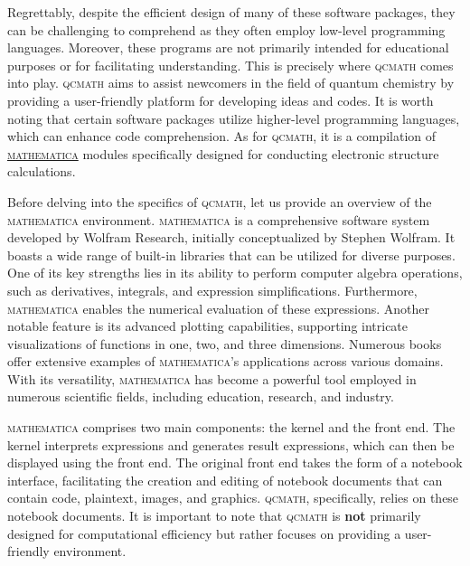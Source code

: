 \documentclass[aip,jcp,reprint,noshowkeys,superscriptaddress]{revtex4-1}
\newcommand{\qcmath}{\textsc{qcmath}\xspace}
\newcommand{\mathematica}{\textsc{mathematica}\xspace}
\begin{document}
Regrettably, despite the efficient design of many of these software packages, they can be challenging to comprehend as they often employ low-level programming languages. Moreover, these programs are not primarily intended for educational purposes or for facilitating understanding. This is precisely where \qcmath comes into play. \qcmath aims to assist newcomers in the field of quantum chemistry by providing a user-friendly platform for developing ideas and codes. It is worth noting that certain software packages utilize higher-level programming languages, which can enhance code comprehension. As for \qcmath, it is a compilation of \href{https://www.wolfram.com/mathematica/}{\mathematica} modules specifically designed for conducting electronic structure calculations.

Before delving into the specifics of \qcmath, let us provide an overview of the \mathematica environment. \mathematica is a comprehensive software system developed by Wolfram Research, initially conceptualized by Stephen Wolfram. It boasts a wide range of built-in libraries that can be utilized for diverse purposes. One of its key strengths lies in its ability to perform computer algebra operations, such as derivatives, integrals, and expression simplifications. Furthermore, \mathematica enables the numerical evaluation of these expressions. Another notable feature is its advanced plotting capabilities, supporting intricate visualizations of functions in one, two, and three dimensions. Numerous books offer extensive examples of \mathematica's applications across various domains. With its versatility, \mathematica has become a powerful tool employed in numerous scientific fields, including education, research, and industry.

\mathematica comprises two main components: the kernel and the front end. The kernel interprets expressions and generates result expressions, which can then be displayed using the front end. The original front end takes the form of a notebook interface, facilitating the creation and editing of notebook documents that can contain code, plaintext, images, and graphics. \qcmath, specifically, relies on these notebook documents. It is important to note that \qcmath is \textbf{not} primarily designed for computational efficiency but rather focuses on providing a user-friendly environment.

\end{document}
